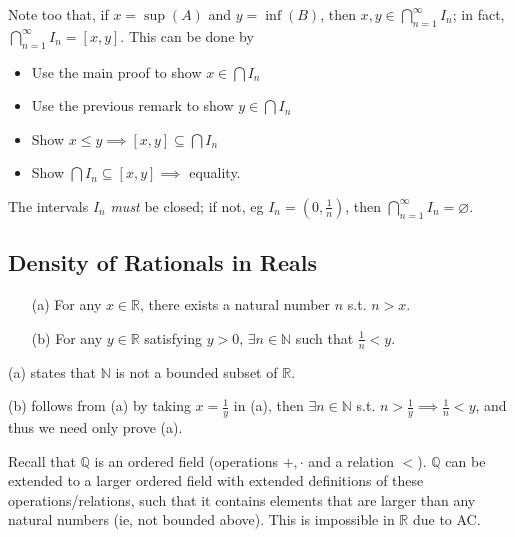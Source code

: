 \documentclass[12pt]{article}
\begin{document}
\begin{remark}
  Note too that, if $x = \sup(A)$ and $y = \inf(B)$, then $x, y \in \bigcap_{n=1}^\infty I_n$; in fact, $\bigcap_{n=1}^\infty I_n = [x,y]$. This can be done by
  \begin{itemize}
    \item Use the main proof to show $x \in \bigcap I_n$
    \item Use the previous remark to show $y \in \bigcap I_n$
    \item Show $x \leq y \implies [x,y] \subseteq \bigcap I_n$
    \item Show $\bigcap I_n \subseteq [x,y] \implies $ equality.
  \end{itemize}
\end{remark}

\begin{remark}
  The intervals $I_n$ \emph{must} be closed; if not, eg $I_n = (0, \frac{1}{n})$, then $\bigcap_{n=1}^\infty I_n = \varnothing$.
\end{remark}

\subsection{Density of Rationals in Reals}

\begin{proposition}\label{prop:archimedian}
  \begin{itemize}
    \item[(a)] For any $x \in \mathbb{R}$, there exists a natural number $n$ s.t. $n > x$.
    \item[(b)] For any $y \in \mathbb{R}$ satisfying $y > 0$, $\exists n \in \mathbb{N}$ such that $\frac{1}{n} < y$.
  \end{itemize}
\end{proposition}
\begin{remark}
  (a) states that $\mathbb{N}$ is not a bounded subset of $\mathbb{R}$.

\end{remark}
  
\begin{remark}
  (b) follows from (a) by taking $x = \frac{1}{y}$ in (a), then $\exists n\in \mathbb{N}$ s.t. $n > \frac{1}{y} \implies \frac{1}{n} < y$, and thus we need only prove (a).
\end{remark}

\begin{remark}
  Recall that $\mathbb{Q}$ is an ordered field (operations $+, \cdot$ and a relation $<$). $\mathbb{Q}$ can be extended to a larger ordered field with extended definitions of these operations/relations, such that it contains elements that are larger than any natural numbers (ie, not bounded above). This is impossible in $\mathbb{R}$ due to AC.
\end{remark}
\end{document}
